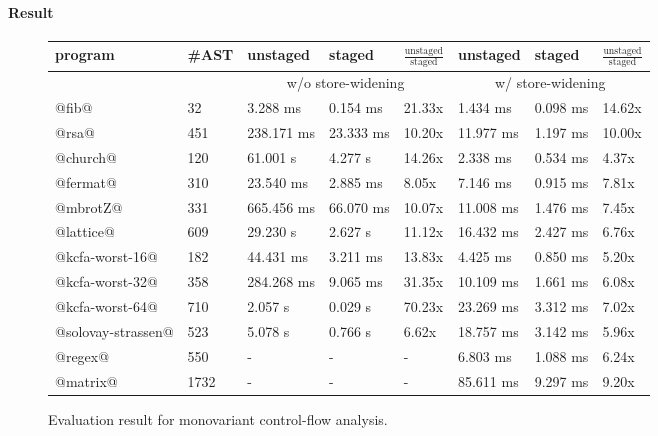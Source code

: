\paragraph{Result}

\begin{figure}[h]
\footnotesize
\begin{tabular}{@{}ll|lll|lll@{}}
\toprule
    program             &\#AST & unstaged   & staged     & $\frac{\text{unstaged}}{\text{staged}}$ & unstaged   & staged    & $\frac{\text{unstaged}}{\text{staged}}$  \\ 
    \midrule
                        &      & \multicolumn{3}{c}{w/o store-widening}  &  \multicolumn{3}{c}{w/ store-widening}\\
    \midrule
    @fib@               & 32   & 3.288 ms   & 0.154 ms   & 21.33x      & 1.434 ms   & 0.098 ms  &  14.62x       \\
    @rsa@               & 451  & 238.171 ms & 23.333 ms  & 10.20x      & 11.977 ms  & 1.197 ms  &  10.00x       \\
    @church@            & 120  & 61.001 s   & 4.277 s    & 14.26x      & 2.338 ms   & 0.534 ms  &  4.37x        \\
    @fermat@            & 310  & 23.540 ms  & 2.885 ms   & 8.05x       & 7.146 ms   & 0.915 ms  &  7.81x        \\
    @mbrotZ@            & 331  & 665.456 ms & 66.070 ms  & 10.07x      & 11.008 ms  & 1.476 ms  &  7.45x        \\
    @lattice@           & 609  & 29.230 s   & 2.627 s    & 11.12x      & 16.432 ms  & 2.427 ms  &  6.76x        \\
    @kcfa-worst-16@     & 182  & 44.431 ms  & 3.211 ms   & 13.83x      & 4.425 ms   & 0.850 ms  &  5.20x        \\
    @kcfa-worst-32@     & 358  & 284.268 ms & 9.065 ms   & 31.35x      & 10.109 ms  & 1.661 ms  &  6.08x        \\
    @kcfa-worst-64@     & 710  & 2.057 s    & 0.029 s    & 70.23x      & 23.269 ms  & 3.312 ms  &  7.02x        \\
    @solovay-strassen@  & 523  & 5.078 s    & 0.766 s    & 6.62x       & 18.757 ms  & 3.142 ms  &  5.96x       \\
    @regex@             & 550  & -          & -          & -           & 6.803 ms   & 1.088 ms  &  6.24x       \\
    @matrix@            & 1732 & -          & -          & -           & 85.611 ms  & 9.297 ms  &  9.20x       \\
    \bottomrule
\end{tabular}
\caption{Evaluation result for monovariant control-flow analysis.} \label{evaluation_result}
\end{figure}

